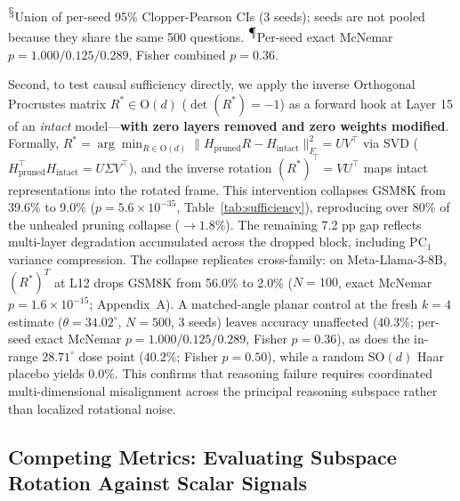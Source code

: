 \documentclass[pmlr,onecolumn]{jmlr}
\begin{document}
\noindent\textsuperscript{$\mathsection$}Union of per-seed 95\% Clopper-Pearson CIs (3 seeds); seeds are not pooled because they share the same 500 questions. \textsuperscript{$\mathparagraph$}Per-seed exact McNemar $p = 1.000/0.125/0.289$, Fisher combined $p = 0.36$.

Second, to test causal sufficiency directly, we apply the inverse Orthogonal Procrustes \citep{schonemann1966generalized} matrix $R^* \in \text{O}(d)$ ($\det(R^*) = -1$) as a forward hook at Layer 15 of an \textit{intact} model---\textbf{with zero layers removed and zero weights modified}. Formally, $R^* = \arg\min_{R \in \mathrm{O}(d)} \|H_{\mathrm{pruned}} R - H_{\mathrm{intact}}\|_F^2 = U V^\top$ via SVD ($H_{\mathrm{pruned}}^\top H_{\mathrm{intact}} = U \Sigma V^\top$), and the inverse rotation $(R^*)^\top = V U^\top$ maps intact representations into the rotated frame. This intervention collapses GSM8K from 39.6\% to 9.0\% ($p = 5.6 \times 10^{-35}$, Table~\ref{tab:sufficiency}), reproducing over 80\% of the unhealed pruning collapse ($\to 1.8\%$). The remaining 7.2 pp gap reflects multi-layer degradation accumulated across the dropped block, including $\mathrm{PC}_1$ variance compression. The collapse replicates cross-family: on Meta-Llama-3-8B, $(R^*)^T$ at L12 drops GSM8K from 56.0\% to 2.0\% ($N=100$, exact McNemar $p = 1.6\times10^{-15}$; Appendix~A). A matched-angle planar control at the fresh $k{=}4$ estimate ($\theta = 34.02^\circ$, $N=500$, 3 seeds) leaves accuracy unaffected ($40.3\%$; per-seed exact McNemar $p = 1.000/0.125/0.289$, Fisher $p = 0.36$), as does the in-range $28.71^\circ$ dose point ($40.2\%$; Fisher $p = 0.50$), while a random $\text{SO}(d)$ Haar placebo yields 0.0\%. This confirms that reasoning failure requires coordinated multi-dimensional misalignment across the principal reasoning subspace rather than localized rotational noise.

\subsection{Competing Metrics: Evaluating Subspace Rotation Against Scalar Signals}
\end{document}
